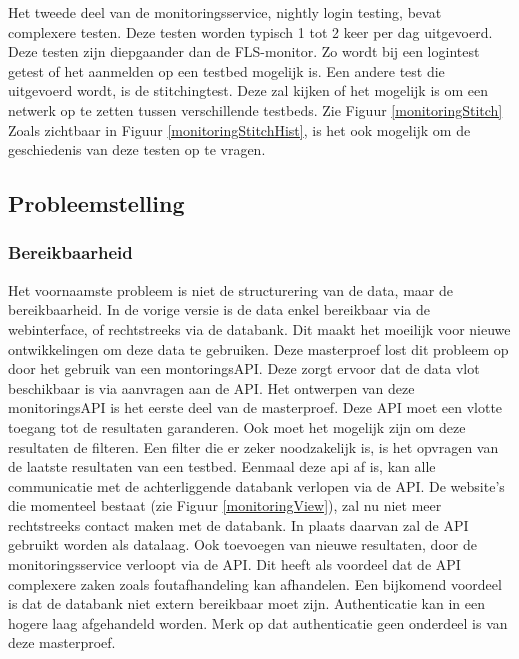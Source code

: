 \clearpage
\npar
Het tweede deel van de monitoringsservice, nightly login testing, bevat complexere testen. Deze testen worden typisch 1 tot 2 keer per dag uitgevoerd. Deze testen zijn diepgaander dan de FLS-monitor. Zo wordt bij een logintest getest of het aanmelden op een testbed mogelijk is. Een andere test die uitgevoerd wordt, is de stitchingtest. Deze zal kijken of het mogelijk is om een netwerk op te zetten tussen verschillende testbeds. Zie Figuur \ref{monitoringStitch}
Zoals zichtbaar in Figuur \ref{monitoringStitchHist}, is het ook mogelijk om de geschiedenis van deze testen op te vragen. 
\clearpage

\subsection{Probleemstelling}
\subsubsection{Bereikbaarheid}
\npar
Het voornaamste probleem is niet de structurering van de data, maar de bereikbaarheid. In de vorige versie is de data enkel bereikbaar via de webinterface, of rechtstreeks via de databank. Dit maakt het moeilijk voor nieuwe ontwikkelingen om deze data te gebruiken. Deze masterproef lost dit probleem op door het gebruik van een montoringsAPI. Deze zorgt ervoor dat de data vlot beschikbaar is via aanvragen aan de API.
\npar
Het ontwerpen van deze monitoringsAPI is het eerste deel van de masterproef. Deze API moet een vlotte toegang tot de resultaten garanderen. Ook moet het mogelijk zijn om deze resultaten de filteren. Een filter die er zeker noodzakelijk is, is het opvragen van de laatste resultaten van een testbed. Eenmaal deze api af is, kan alle communicatie met de achterliggende databank verlopen via de API. De website's die momenteel bestaat (zie Figuur \ref{monitoringView}), zal nu niet meer rechtstreeks contact maken met de databank. In plaats daarvan zal de API gebruikt worden als datalaag.
\npar
Ook toevoegen van nieuwe resultaten, door de monitoringsservice verloopt via de API. Dit heeft als voordeel dat de API complexere zaken zoals foutafhandeling kan afhandelen. Een bijkomend voordeel is dat de databank niet extern bereikbaar moet zijn. Authenticatie kan in een hogere laag afgehandeld worden. Merk op dat authenticatie geen onderdeel is van deze masterproef.

